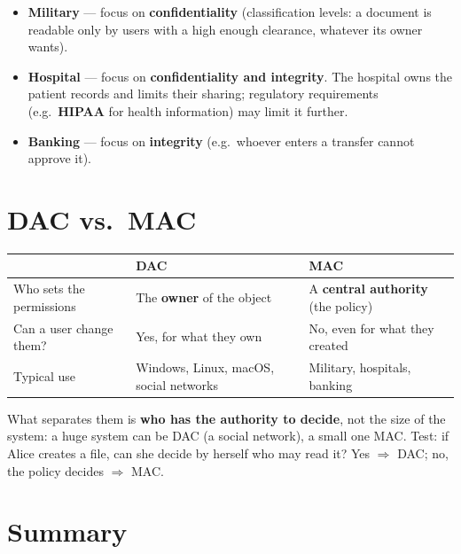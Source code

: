 \begin{exbox}[title=Where is MAC used?]
\begin{itemize}
  \item \textbf{Military} --- focus on \textbf{confidentiality} (classification levels:
        a document is readable only by users with a high enough clearance, whatever its
        owner wants).
  \item \textbf{Hospital} --- focus on \textbf{confidentiality and integrity}. The
        hospital owns the patient records and limits their sharing; regulatory
        requirements (e.g.\ \textbf{HIPAA} for health information) may limit it further.
  \item \textbf{Banking} --- focus on \textbf{integrity} (e.g.\ whoever enters a transfer
        cannot approve it).
\end{itemize}
\end{exbox}

\section{DAC vs.\ MAC}

\begin{center}
\begin{tabularx}{\linewidth}{@{}l X X@{}}
\toprule
 & \textbf{DAC} & \textbf{MAC} \\
\midrule
Who sets the permissions & The \textbf{owner} of the object & A \textbf{central authority} (the policy) \\
Can a user change them?  & Yes, for what they own         & No, even for what they created \\
Typical use & Windows, Linux, macOS, social networks & Military, hospitals, banking \\
\bottomrule
\end{tabularx}
\end{center}

\begin{rembox}[title=It is not a question of scale]
What separates them is \textbf{who has the authority to decide}, not the size of the
system: a huge system can be DAC (a social network), a small one MAC. Test: if Alice
creates a file, can she decide by herself who may read it? Yes $\Rightarrow$ DAC; no,
the policy decides $\Rightarrow$ MAC.
\end{rembox}

\section{Summary}

